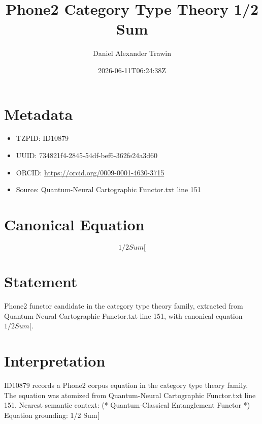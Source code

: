 \documentclass[11pt]{article}
\title{Phone2 Category Type Theory 1/2 Sum}
\author{Daniel Alexander Trawin}
\date{2026-06-11T06:24:38Z}
\begin{document}
\maketitle
\section*{Metadata}
\begin{itemize}
\item TZPID: ID10879
\item UUID: 734821f4-2845-54df-bef6-362fe24a3d60
\item ORCID: \url{https://orcid.org/0009-0001-4630-3715}
\item Source: Quantum-Neural Cartographic Functor.txt line 151
\end{itemize}
\section*{Canonical Equation}
\[
1/2 Sum[
\]
\section*{Statement}
Phone2 functor candidate in the category type theory family, extracted from Quantum-Neural Cartographic Functor.txt line 151, with canonical equation $1/2 Sum[$.
\section*{Interpretation}
ID10879 records a Phone2 corpus equation in the category type theory family. The equation was atomized from Quantum-Neural Cartographic Functor.txt line 151. Nearest semantic context: (* Quantum-Classical Entanglement Functor *) Equation grounding: 1/2 Sum[
\end{document}
